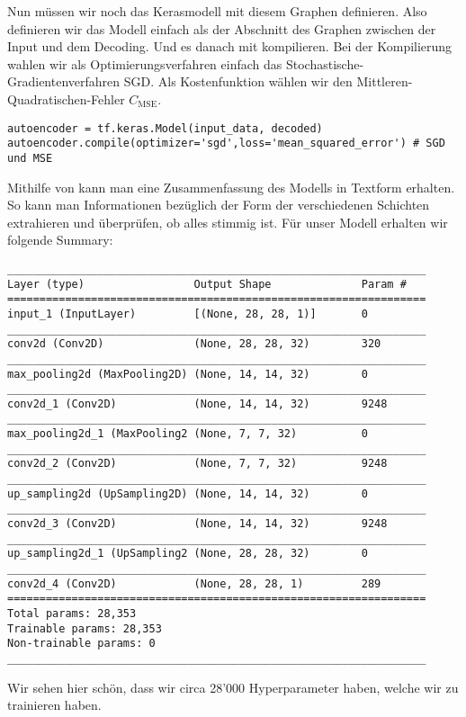 Nun müssen wir noch das Kerasmodell mit diesem Graphen definieren. Also
definieren wir das Modell einfach als der Abschnitt des Graphen zwischen der
Input und dem Decoding.
Und es danach mit kompilieren. Bei der Kompilierung wahlen wir als
Optimierungsverfahren einfach das Stochastische-Gradientenverfahren SGD. Als
Kostenfunktion wählen wir den Mittleren-Quadratischen-Fehler $C_{\text{MSE}}$.
\begin{verbatim}
autoencoder = tf.keras.Model(input_data, decoded)
autoencoder.compile(optimizer='sgd',loss='mean_squared_error') # SGD und MSE
\end{verbatim}
Mithilfe von  kann man eine Zusammenfassung des
Modells in Textform erhalten. So kann man Informationen bezüglich der Form der
verschiedenen Schichten extrahieren und überprüfen, ob alles stimmig ist.
Für unser Modell erhalten wir folgende Summary:
\begin{verbatim}
_________________________________________________________________
Layer (type)                 Output Shape              Param #
=================================================================
input_1 (InputLayer)         [(None, 28, 28, 1)]       0
_________________________________________________________________
conv2d (Conv2D)              (None, 28, 28, 32)        320
_________________________________________________________________
max_pooling2d (MaxPooling2D) (None, 14, 14, 32)        0
_________________________________________________________________
conv2d_1 (Conv2D)            (None, 14, 14, 32)        9248
_________________________________________________________________
max_pooling2d_1 (MaxPooling2 (None, 7, 7, 32)          0
_________________________________________________________________
conv2d_2 (Conv2D)            (None, 7, 7, 32)          9248
_________________________________________________________________
up_sampling2d (UpSampling2D) (None, 14, 14, 32)        0
_________________________________________________________________
conv2d_3 (Conv2D)            (None, 14, 14, 32)        9248
_________________________________________________________________
up_sampling2d_1 (UpSampling2 (None, 28, 28, 32)        0
_________________________________________________________________
conv2d_4 (Conv2D)            (None, 28, 28, 1)         289
=================================================================
Total params: 28,353
Trainable params: 28,353
Non-trainable params: 0
_________________________________________________________________
\end{verbatim}
Wir sehen hier schön, dass wir circa 28'000 Hyperparameter haben, welche wir zu
trainieren haben.


